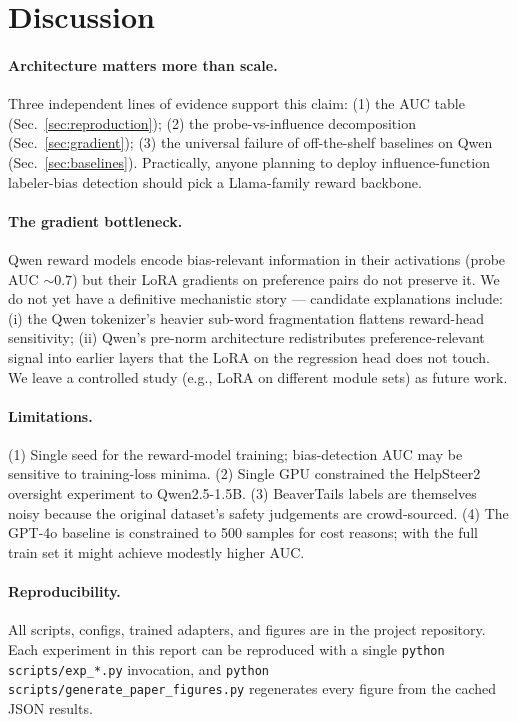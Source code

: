 \documentclass[11pt,a4paper]{article}
\begin{document}
\section{Discussion}

\paragraph{Architecture matters more than scale.} Three independent lines of evidence support
this claim: (1) the AUC table (Sec.~\ref{sec:reproduction}); (2) the probe-vs-influence
decomposition (Sec.~\ref{sec:gradient}); (3) the universal failure of off-the-shelf baselines
on Qwen (Sec.~\ref{sec:baselines}). Practically, anyone planning to deploy influence-function
labeler-bias detection should pick a Llama-family reward backbone.

\paragraph{The gradient bottleneck.} Qwen reward models encode bias-relevant information in
their activations (probe AUC $\sim$$0.7$) but their LoRA gradients on preference pairs do
not preserve it. We do not yet have a definitive mechanistic story --- candidate explanations
include: (i) the Qwen tokenizer's heavier sub-word fragmentation flattens reward-head
sensitivity; (ii) Qwen's pre-norm architecture redistributes preference-relevant signal
into earlier layers that the LoRA on the regression head does not touch. We leave a
controlled study (e.g., LoRA on different module sets) as future work.

\paragraph{Limitations.}
(1) Single seed for the reward-model training; bias-detection AUC may be sensitive
to training-loss minima. (2) Single GPU constrained the HelpSteer2 oversight experiment to
Qwen2.5-1.5B. (3) BeaverTails labels are themselves noisy because the original dataset's
safety judgements are crowd-sourced. (4) The GPT-4o baseline is constrained to 500 samples
for cost reasons; with the full train set it might achieve modestly higher AUC.

\paragraph{Reproducibility.}
All scripts, configs, trained adapters, and figures are in the project repository. Each
experiment in this report can be reproduced with a single \texttt{python scripts/exp\_*.py}
invocation, and \texttt{python scripts/generate\_paper\_figures.py} regenerates every figure
from the cached JSON results.
\end{document}
